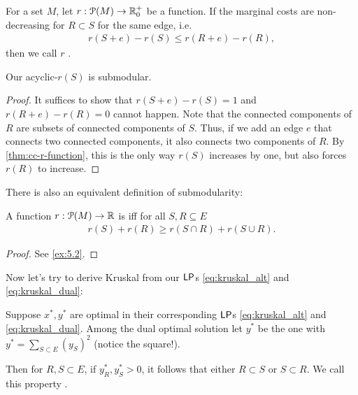 \begin{definition}
    For a set $M$, let $r : \mathcal P(M) \rightarrow \realnum^+_0$ be a function.
    If the marginal costs are non-decreasing for $R \subset S$ for the same edge, i.e.
    \begin{align*}
        r(S+e)-r(S) \leq r(R+e) - r(R),
    \end{align*}
    then we call $r$ .
\end{definition}
\begin{theorem}
    Our acyclic-$r(S)$ is submodular.
\end{theorem}
\begin{proof}
    It suffices to show that $r(S+e)-r(S)=1$ and $r(R+e)-r(R)=0$ cannot happen.
    Note that the connected components of $R$ are subsets of connected components of $S$. Thus, if we add an edge $e$ that connects two
    connected components, it also connects two components of $R$. By \autoref{thm:cc-r-function}, this is the only way $r(S)$ increases by one,
    but also forces $r(R)$ to increase.
\end{proof}
There is also an equivalent definition of submodularity:
\begin{theorem}
    A function $r : \mathcal{P}(M) \rightarrow \realnum$ is  iff for all $S,R \subseteq E$
    \begin{align*}
        r(S)+r(R) \geq r(S\cap R) + r(S \cup R).
    \end{align*}
\end{theorem}
\begin{proof}
    See \autoref{ex:5.2}.
\end{proof}
Now let's try to derive Kruskal from our $\mathsf{LP}$s \eqref{eq:kruskal_alt} and \eqref{eq:kruskal_dual}:
\begin{theorem}
    Suppose $x^*,y^*$ are optimal in their corresponding $\mathsf{LP}$s  \eqref{eq:kruskal_alt} and \eqref{eq:kruskal_dual}.
    Among the dual optimal
    solution let $y^*$ be the one with $y^*=\sum_{S\subset E}(y_S)^2$ (notice the square!).

    Then for $R,S \subset E$, if $y_R^*, y_S^* > 0$, it follows that either $R \subset S$ or $S \subset R$.
    We call this property .
\end{theorem}
